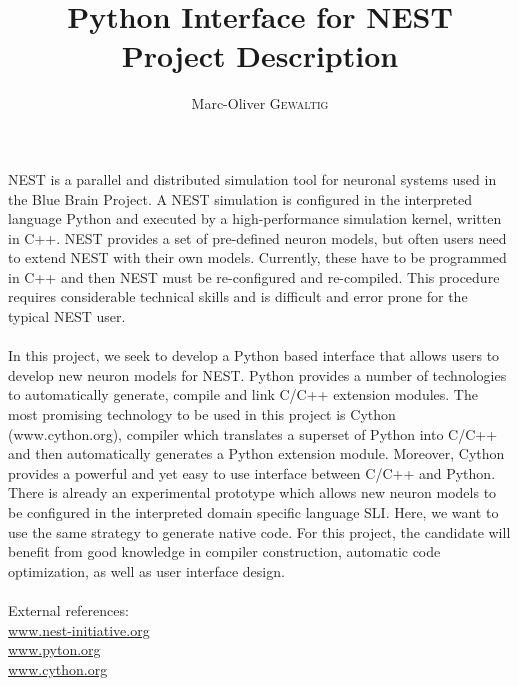\documentclass{article}
\title{Python Interface for NEST \\ Project Description} %
\author{Marc-Oliver \textsc{Gewaltig}} %
\begin{document}
\maketitle %

\setlength\parindent{0pt} %

\renewcommand{\labelenumi}{\alph{enumi}.} %


NEST is a parallel and distributed simulation tool for neuronal systems used in the Blue Brain Project. A NEST simulation is configured in the interpreted language Python and executed by a high-performance simulation kernel, written in C++. NEST provides a set of pre-defined neuron models, but often users need to extend NEST with their own models. Currently, these have to be programmed in C++ and then NEST must be re-configured and re-compiled. This procedure requires considerable technical skills and is difficult and error prone for the typical NEST user. \\
\\
In this project, we seek to develop a Python based interface that allows users to develop new neuron models for NEST. Python provides a number of technologies to automatically generate, compile and link C/C++ extension modules. The most promising technology to be used in this project is Cython (www.cython.org), compiler which translates a superset of Python into C/C++ and then automatically generates a Python extension module. Moreover, Cython provides a powerful and yet easy to use interface between C/C++ and Python. There is already an experimental prototype which allows new neuron models to be configured in the interpreted domain specific language SLI. Here, we want to use the same strategy to generate native code.
For this project, the candidate will benefit from good knowledge in compiler construction, automatic code optimization, as well as user interface design. 
\\
\\
External references: \\
\url{www.nest-initiative.org} \\
\url{www.pyton.org} \\
\url{www.cython.org}
\end{document}
